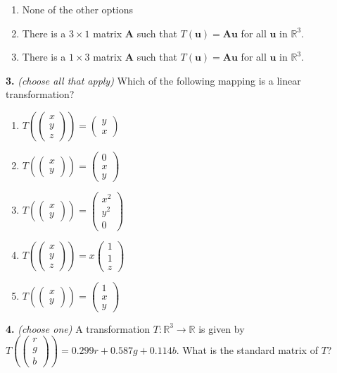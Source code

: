 \documentclass[10pt,a4paper]{article}
\begin{document}
\begin{enumerate}[label=(\Alph*)]
\item None of the other options
\item There is a \(3\times 1\) matrix \(\mathbf{A}\) such that \(T(\mathbf{u})=\mathbf{Au}\) for all \(\mathbf{u}\) in \(\mathbb{R}^3\).
\item There is a \(1\times 3\) matrix \(\mathbf{A}\) such that \(T(\mathbf{u})=\mathbf{Au}\) for all \(\mathbf{u}\) in \(\mathbb{R}^3\).
\end{enumerate}
\smallskip
\textbf{3.} \textit{(choose all that apply)} Which of the following mapping is a linear transformation?

\begin{enumerate}[label=(\Alph*)]
\item \(T\left(\begin{pmatrix}x\\y\\z\end{pmatrix}\right)=\begin{pmatrix}y\\x\end{pmatrix}\)
\item \(T\left(\begin{pmatrix}x\\y\end{pmatrix}\right)=\begin{pmatrix}0\\x\\y\end{pmatrix}\)
\item \(T\left(\begin{pmatrix}x\\y\end{pmatrix}\right)=\begin{pmatrix}x^2\\y^2\\0\end{pmatrix}\)
\item \(T\left(\begin{pmatrix}x\\y\\z\end{pmatrix}\right)=x\begin{pmatrix}1\\1\\z\end{pmatrix}\)
\item \(T\left(\begin{pmatrix}x\\y\end{pmatrix}\right)=\begin{pmatrix}1\\x\\y\end{pmatrix}\)
\end{enumerate}
\smallskip
\textbf{4.} \textit{(choose one)} A transformation \(T:\mathbb{R}^3\to\mathbb{R}\) is given by \(T\left(\begin{pmatrix}r\\g\\b\end{pmatrix} \right)=0.299r+0.587g+0.114b\). What is the standard matrix of \(T\)?
\end{document}

